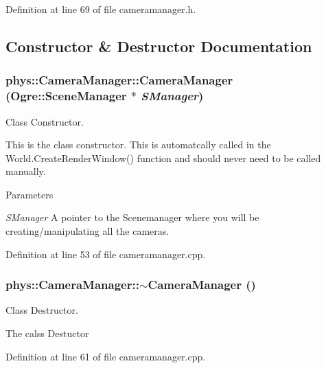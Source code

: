 Definition at line 69 of file cameramanager.h.



\subsection{Constructor \& Destructor Documentation}
\hypertarget{classphys_1_1CameraManager_aff47d21e0c80b2b1b44148b0ec7de344}{
\subsubsection[{CameraManager}]{\setlength{\rightskip}{0pt plus 5cm}phys::CameraManager::CameraManager (Ogre::SceneManager $\ast$ {\em SManager})}}
\label{d9/d91/classphys_1_1CameraManager_aff47d21e0c80b2b1b44148b0ec7de344}


Class Constructor. 

This is the class constructor. This is automatcally called in the World.CreateRenderWindow() function and should never need to be called manually. 
\begin{DoxyParams}{Parameters}
\item[{\em SManager}]A pointer to the Scenemanager where you will be creating/manipulating all the cameras. \end{DoxyParams}


Definition at line 53 of file cameramanager.cpp.

\hypertarget{classphys_1_1CameraManager_a0b0f032477309eb47b0302fd5eef198c}{
\subsubsection[{$\sim$CameraManager}]{\setlength{\rightskip}{0pt plus 5cm}phys::CameraManager::$\sim$CameraManager ()}}
\label{d9/d91/classphys_1_1CameraManager_a0b0f032477309eb47b0302fd5eef198c}


Class Destructor. 

The calss Destuctor 

Definition at line 61 of file cameramanager.cpp.



